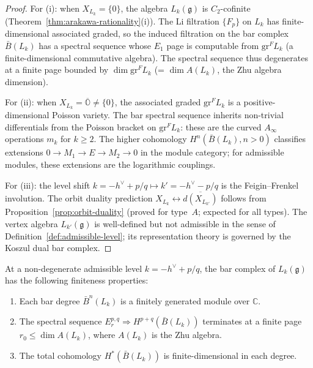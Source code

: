 \begin{proof}
For (i): when $X_{L_k} = \{0\}$, the algebra $L_k(\mathfrak{g})$
is $C_2$-cofinite (Theorem~\ref{thm:arakawa-rationality}(i)).
The Li filtration $\{F_p\}$ on $L_k$ has finite-dimensional
associated graded, so the induced filtration on the bar complex
$\bar{B}(L_k)$ has a spectral sequence whose $E_1$ page is
computable from $\mathrm{gr}^F L_k$ (a finite-dimensional
commutative algebra).  The spectral sequence thus degenerates
at a finite page bounded by $\dim \mathrm{gr}^F L_k$
(= $\dim A(L_k)$, the Zhu algebra dimension).

For (ii): when $X_{L_k} = \overline{\mathbb{O}} \neq \{0\}$,
the associated graded $\mathrm{gr}^F L_k$ is a
positive-dimensional Poisson variety.  The bar spectral
sequence inherits non-trivial differentials from the Poisson
bracket on $\mathrm{gr}^F L_k$: these are the curved $A_\infty$
operations $m_k$ for $k \geq 2$.  The higher cohomology
$H^n(\bar{B}(L_k), n > 0)$ classifies extensions
$0 \to M_1 \to E \to M_2 \to 0$ in the module category; for
admissible modules, these extensions are the logarithmic
couplings.

For (iii): the level shift $k = -h^\vee + p/q \mapsto
k' = -h^\vee - p/q$ is the Feigin--Frenkel involution.  The
orbit duality prediction $X_{L_k} \leftrightarrow
\overline{d(X_{L_{k'}})}$ follows from
Proposition~\ref{prop:orbit-duality} (proved for type~$A$;
expected for all types).  The vertex algebra $L_{k'}(\mathfrak{g})$
is well-defined but not admissible in the sense of
Definition~\ref{def:admissible-level}; its representation theory
is governed by the Koszul dual bar complex.
\end{proof}

\begin{corollary}
\label{cor:bar-admissible-finiteness}
At a non-degenerate admissible level $k = -h^\vee + p/q$, the bar complex of $L_k(\mathfrak{g})$ has the following finiteness properties:
\begin{enumerate}[label=\textup{(\roman*)}]
\item Each bar degree $\bar{B}^n(L_k)$ is a finitely generated module over $\mathbb{C}$.
\item The spectral sequence $E_r^{p,q} \Rightarrow H^{p+q}(\bar{B}(L_k))$ terminates at a finite page $r_0 \leq \dim A(L_k)$, where $A(L_k)$ is the Zhu algebra.
\item The total cohomology $H^*(\bar{B}(L_k))$ is finite-dimensional in each degree.
\end{enumerate}
\end{corollary}

